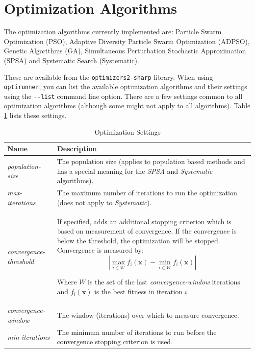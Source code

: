 \documentclass{report}
\begin{document}
\section{Optimization Algorithms}\label{sec:optimization}
The optimization algorithms currently implemented are:
Particle Swarm Optimization (PSO), Adaptive Diversity Particle Swarm Optimization (ADPSO),
Genetic Algorithms (GA), Simultaneous Perturbation Stochastic Approximation (SPSA)
and Systematic Search (Systematic).

These are available from the \verb!optimizers2-sharp! library. When using
\verb!optirunner!, you can list the available optimization algorithms and
their settings using the \verb!--list! command line option. There are a few
settings common to all optimization algorithms (although some might not apply
to all algorithms). Table \ref{tab:general_settings} lists these settings.

\begin{table}[h!tb]\caption{Optimization Settings}\label{tab:general_settings}\vspace{0.1in}
	\centering

	\begin{tabular}{p{4cm} p{12cm}}
		\toprule
		\textbf{Name} & \textbf{Description} \\
		\midrule
		\textit{population-size} & The population size (applies to
		                           population based methods and has
		                           a special meaning for the
		                           \textit{SPSA} and \textit{Systematic}
		                           algorithms). \\
		\textit{max-iterations} & The maximum number of iterations to
		                          run the optimization (does not apply
		                          to \textit{Systematic}). \\
		\textit{convergence-threshold} & If specified, adds an
		                                 additional stopping criterion
		                                 which is based on measurement
		                                 of convergence. If the
		                                 convergence is below the
		                                 threshold, the optimization
		                                 will be stopped. Convergence
		                                 is measured by:
			\begin{displaymath}
				|\max_{i \in W}{f_i(\mathbf{x})} - \min_{i \in W}{f_i(\mathbf{x})}|
			\end{displaymath}

			Where $W$ is the set of the last
			\textit{convergence-window} iterations and $f_i(\mathbf{x})$
			is the best fitness in iteration $i$. \\
		\textit{convergence-window} & The window (iterations) over which
		                              to measure convergence. \\
		\textit{min-iterations} & The minimum number of iterations to
		                          run before the convergence stopping
		                          criterion is used. \\
		\bottomrule
	\end{tabular}
\end{table}
\end{document}
